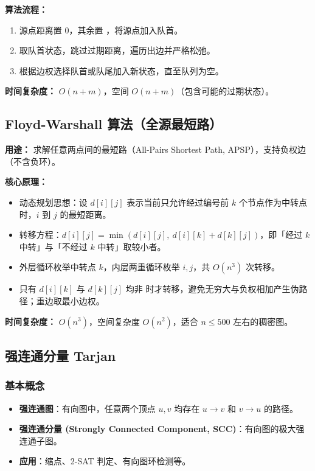 \textbf{算法流程：}
\begin{enumerate}
  \item 源点距离置 $0$，其余置 ，将源点加入队首。
  \item 取队首状态，跳过过期距离，遍历出边并严格松弛。
  \item 根据边权选择队首或队尾加入新状态，直至队列为空。
\end{enumerate}

\textbf{时间复杂度：} $O(n+m)$，空间 $O(n+m)$（包含可能的过期状态）。



\subsection{Floyd-Warshall 算法（全源最短路）}

\textbf{用途：} 求解任意两点间的最短路（All-Pairs Shortest Path, APSP），支持负权边（不含负环）。

\textbf{核心原理：}

\begin{itemize}
  \item 动态规划思想：设 $d[i][j]$ 表示当前只允许经过编号前 $k$ 个节点作为中转点时，$i$ 到 $j$ 的最短距离。
  \item 转移方程：$d[i][j] = \min(d[i][j],\ d[i][k] + d[k][j])$，即「经过 $k$ 中转」与「不经过 $k$ 中转」取较小者。
  \item 外层循环枚举中转点 $k$，内层两重循环枚举 $i, j$，共 $O(n^3)$ 次转移。
  \item 只有 $d[i][k]$ 与 $d[k][j]$ 均非  时才转移，避免无穷大与负权相加产生伪路径；重边取最小边权。
\end{itemize}

\textbf{时间复杂度：} $O(n^3)$，空间复杂度 $O(n^2)$，适合 $n \le 500$ 左右的稠密图。



\subsection{强连通分量 Tarjan}

\subsubsection{基本概念}

\begin{itemize}
  \item \textbf{强连通图}：有向图中，任意两个顶点 $u, v$ 均存在 $u \to v$ 和 $v \to u$ 的路径。
  \item \textbf{强连通分量 (Strongly Connected Component, SCC)}：有向图的极大强连通子图。
  \item \textbf{应用}：缩点、2-SAT 判定、有向图环检测等。
\end{itemize}

